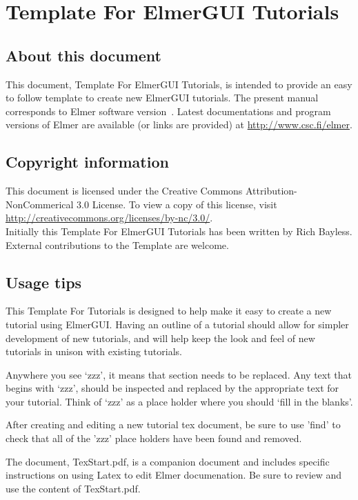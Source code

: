 \chapter*{Template For ElmerGUI Tutorials}

\section*{About this document}

This document, Template For ElmerGUI Tutorials, is intended to provide an easy to follow template to create new ElmerGUI tutorials.  The present manual corresponds to Elmer software version~\elmerversion{}.  Latest documentations and program versions of Elmer are available (or links are provided) at \url{http://www.csc.fi/elmer}. 

\section*{Copyright information}

This document is licensed under the Creative Commons Attribution-NonCommerical 3.0 License.  To view a copy of this license, visit \url{http://creativecommons.org/licenses/by-nc/3.0/}.\\

Initially this Template For ElmerGUI Tutorials has been written by Rich Bayless.  External contributions to the Template are welcome.

\section*{Usage tips}

This Template For Tutorials is designed to help make it easy to create a new tutorial using ElmerGUI.  Having an outline of a tutorial should allow for simpler development of new tutorials, and will help keep the look and feel of new tutorials in unison with existing tutorials.

Anywhere you see `zzz', it means that section needs to be replaced.  Any text that begins with `zzz', should be inspected and replaced by the appropriate text for your tutorial.  Think of `zzz' as a place holder where you should `fill in the blanks'.

After creating and editing a new tutorial tex document, be sure to use 'find' to check that all of the 'zzz' place holders have been found and removed.

The document, TexStart.pdf, is a companion document and includes specific instructions on using Latex to edit Elmer documenation.  Be sure to review and use the content of TexStart.pdf.\\

